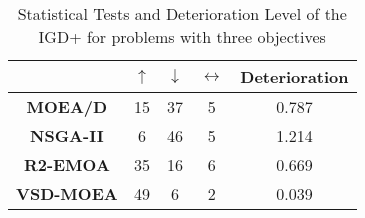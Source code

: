 \begin{table}[t]
\centering
\caption{Statistical Tests and Deterioration Level of the IGD+ for problems with three objectives}
\label{tab:Tests_IGDP_3obj}
\begin{scriptsize}
\begin{tabular}{c c|c|c|c}
\cline{2-5}
                                        & \textbf{$\uparrow$} & \textbf{$\downarrow$} & \textbf{$\leftrightarrow$} & \textbf{Deterioration} \\ \hline
\multicolumn{1}{c|}{\textbf{MOEA/D}}   & 15                  & 37                    & 5                          & 0.787         \\ \hline
\multicolumn{1}{c|}{\textbf{NSGA-II}}  & 6                   & 46                    & 5                          & 1.214         \\ \hline
\multicolumn{1}{c|}{\textbf{R2-EMOA}}  & 35                  & 16                    & 6                          & 0.669         \\ \hline
\multicolumn{1}{c|}{\textbf{VSD-MOEA}} & 49                  & 6                     & 2                          & 0.039         \\ \hline
\end{tabular}%
\end{scriptsize}
\end{table}

